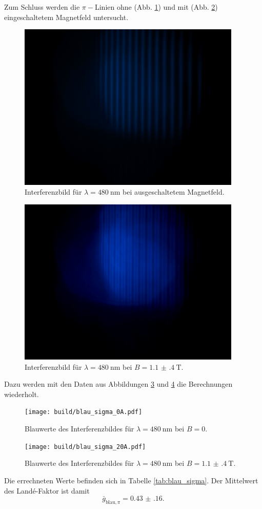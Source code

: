 Zum Schluss werden die $\pi-$Linien ohne (Abb. \ref{fig:blau_sigma_0A}) und mit (Abb. \ref{fig:blau_sigma_20A}) eingeschaltetem Magnetfeld untersucht.
\begin{figure}[htb]
  \centering
  \includegraphics[height=8cm]{content/pictures/blau_sigma_0A.JPG}
  \caption{Interferenzbild für $\lambda=\SI{480}{\nano\meter}$ bei ausgeschaltetem Magnetfeld.}
  \label{fig:blau_sigma_0A}
\end{figure}
\begin{figure}[htb]
  \centering
  \includegraphics[height=8cm]{content/pictures/blau_sigma_20A.JPG}
  \caption{Interferenzbild für $\lambda=\SI{480}{\nano\meter}$ bei $B=\SI{1.1(4)}{\tesla}$.}
  \label{fig:blau_sigma_20A}
\end{figure}
Dazu werden mit den Daten aus Abbildungen \ref{fig:blau_sigma_0A_plot} und \ref{fig:blau_sigma_20A_plot} die Berechnungen wiederholt.
\begin{figure}[htb]
  \centering
  \texttt{[image: build/blau\_sigma\_0A.pdf]}
  \caption{Blauwerte des Interferenzbildes für $\lambda=\SI{480}{\nano\meter}$ bei $B=0$.}
  \label{fig:blau_sigma_0A_plot}
\end{figure}
\begin{figure}[htb]
  \centering
  \texttt{[image: build/blau\_sigma\_20A.pdf]}
  \caption{Blauwerte des Interferenzbildes für $\lambda=\SI{480}{\nano\meter}$ bei $B=\SI{1.1(4)}{\tesla}$.}
  \label{fig:blau_sigma_20A_plot}
\end{figure}
Die errechneten Werte befinden sich in Tabelle \ref{tab:blau_sigma}.
Der Mittelwert des Landé-Faktor ist damit
\begin{equation}
\label{eqn:g_blau_pi}
\bar{g}_{\text{blau},\pi}=\num{0.43(16)}.
\end{equation}

\FloatBarrier